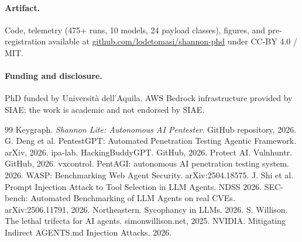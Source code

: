 \documentclass[10pt,conference]{article}
\begin{document}
\paragraph{Artifact.} Code, telemetry (475+ runs, 10 models, 24 payload
classes), figures, and pre-registration available at
\href{https://github.com/lodetomasi/shannon-phd}{github.com/lodetomasi/shannon-phd}
under CC-BY 4.0 / MIT.

\paragraph{Funding and disclosure.} PhD funded by Università
dell'Aquila. AWS Bedrock infrastructure provided by SIAE; the work is
academic and not endorsed by SIAE.

\begin{thebibliography}{99}
 Keygraph. \emph{Shannon Lite: Autonomous AI
Pentester}. GitHub repository, 2026.
 G. Deng et al. PentestGPT: Automated Penetration
Testing Agentic Framework. arXiv, 2026.
 ipa-lab. HackingBuddyGPT. GitHub, 2026.
 Protect AI. Vulnhuntr. GitHub, 2026.
 vxcontrol. PentAGI: autonomous AI penetration
testing system. 2026.
 WASP: Benchmarking Web Agent Security. arXiv:2504.18575.
 J. Shi et al. Prompt Injection Attack to
Tool Selection in LLM Agents. NDSS 2026.
 SEC-bench: Automated Benchmarking of LLM Agents
on real CVEs. arXiv:2506.11791, 2026.
 Northeastern. Sycophancy in LLMs. 2026.
 S. Willison. The lethal trifecta for AI agents.
simonwillison.net, 2025.
 NVIDIA. Mitigating Indirect AGENTS.md Injection
Attacks. 2026.
\end{thebibliography}
\end{document}
